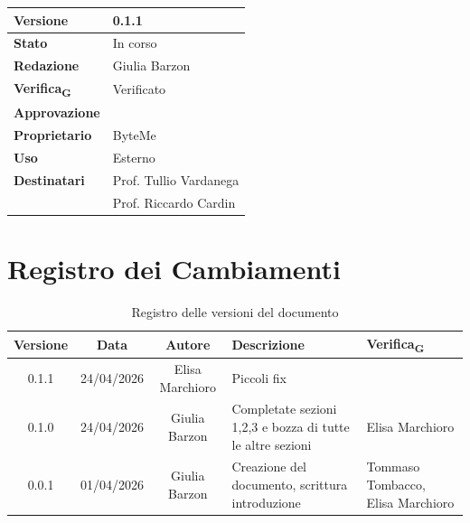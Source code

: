 \documentclass[11pt,a4paper]{article}
\newcommand{\gls}[1]{#1\textsubscript{G}}
\begin{document}
\begin{titlepage}
    \begin{table}[H]
        \centering
        \begin{tabular}{|l|p{5cm}|}
            \hline
            \textbf{Versione} & 0.1.1 \\
            \hline
            \textbf{Stato} & In corso\\
            \hline
            \textbf{Redazione} & Giulia Barzon\\
            \hline
            \textbf{\gls{Verifica}} & Verificato \\
            \hline
            \textbf{Approvazione} & \\
            \hline
            \textbf{Proprietario} & ByteMe \\
            \hline
            \textbf{Uso} & Esterno \\
            \hline
            \textbf{Destinatari} & Prof. Tullio Vardanega \\ & Prof. Riccardo Cardin \\
            \hline
        \end{tabular}
    \end{table}
    
    \vfill
\end{titlepage}

\thispagestyle{empty}
\section*{Registro dei Cambiamenti}

\begin{table}[H]
    \centering
    \begin{tabular}{|c|c|c|>{\raggedright\arraybackslash}p{}|p{}|}
        \hline
        \textbf{Versione} & \textbf{Data} & \textbf{Autore} & \textbf{Descrizione} & \textbf{\gls{Verifica}} \\
        \hline
        0.1.1 & 24/04/2026 & Elisa Marchioro & Piccoli fix & \\
        \hline
        0.1.0 & 24/04/2026 & Giulia Barzon & Completate sezioni 1,2,3 e bozza di tutte le altre sezioni & Elisa Marchioro\\
        \hline
        0.0.1 & 01/04/2026 & Giulia Barzon & Creazione del documento, scrittura introduzione & Tommaso Tombacco, Elisa Marchioro \\
        \hline
    \end{tabular}
    \caption{Registro delle versioni del documento}
    \label{tab:versionamento}
\end{table}
\end{document}
